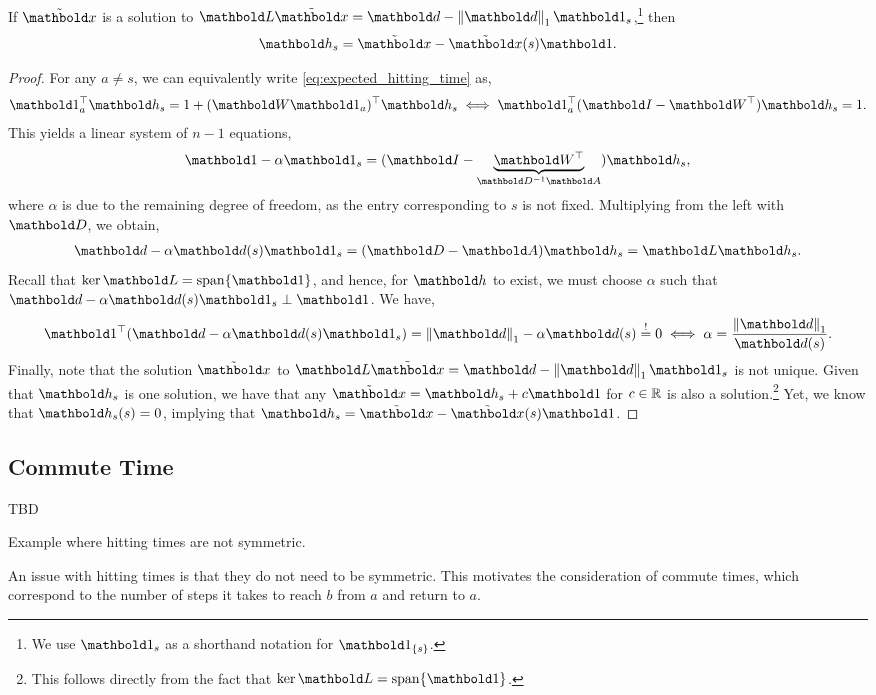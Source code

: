 \begin{lem}
If $\ex$ is a solution to $\mL\ex = \vd - \norm{\vd}_1 \vOne_s$,\footnote{We use $\vOne_s$ as a shorthand notation for $\vOne_{\{s\}}$.} then \begin{align}
    \vh_s = \ex - \ex(s)\vOne.
\end{align}
\end{lem}
\begin{proof}
For any $a \neq s$, we can equivalently write \cref{eq:expected_hitting_time} as, \begin{align*}
    \trans{\vOne_a}\vh_s = 1 + \trans{(\mW \vOne_a)}\vh_s \iff \trans{\vOne_a}(\mI - \trans{\mW})\vh_s = 1.
\end{align*} This yields a linear system of $n-1$ equations, \begin{align}
    \vOne - \alpha \vOne_s = (\mI - \underbrace{\trans{\mW}}_{\inv{\mD}\mA})\vh_s,
\end{align} where $\alpha$ is due to the remaining degree of freedom, as the entry corresponding to $s$ is not fixed. Multiplying from the left with $\mD$, we obtain, \begin{align*}
    \vd - \alpha \vd(s) \vOne_s = (\mD - \mA)\vh_s = \mL\vh_s.
\end{align*} Recall that $\ker{\mL} = \vspan\{\vOne\}$, and hence, for $\vh$ to exist, we must choose $\alpha$ such that $\vd - \alpha \vd(s) \vOne_s \perp \vOne$. We have, \begin{align*}
    \trans{\vOne}(\vd - \alpha \vd(s) \vOne_s) = \norm{\vd}_1 - \alpha \vd(s) \overset{!}{=} 0 \iff \alpha = \frac{\norm{\vd}_1}{\vd(s)}.
\end{align*} Finally, note that the solution $\ex$ to $\mL\ex = \vd - \norm{\vd}_1 \vOne_s$ is not unique. Given that $\vh_s$ is one solution, we have that any $\ex = \vh_s + c\vOne$ for $c \in \mathbb{R}$ is also a solution.\footnote{This follows directly from the fact that $\ker{\mL} = \vspan\{\vOne\}$.} Yet, we know that $\vh_s(s) = 0$, implying that $\vh_s = \ex - \ex(s)\vOne$.
\end{proof}

\subsection{Commute Time}

\begin{marginfigure}
TBD
\caption{Example where hitting times are not symmetric.}
\end{marginfigure}
An issue with hitting times is that they do not need to be symmetric. This motivates the consideration of commute times, which correspond to the number of steps it takes to reach $b$ from $a$ and return to $a$.

